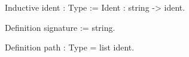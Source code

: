 Inductive ident : Type :=  Ident : string -> ident.

Definition signature := string.

Definition path : Type = list ident.